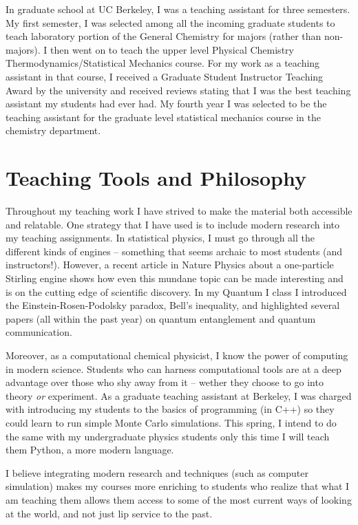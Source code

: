 \documentclass[11pt]{article}
\begin{document}
In graduate school at UC Berkeley, I was a teaching assistant for three semesters.  My first semester, I was selected among all the incoming graduate students to teach laboratory portion of the General Chemistry for majors (rather than non-majors). I then went on to teach the upper level Physical Chemistry Thermodynamics/Statistical Mechanics course.  For my work as a teaching assistant in that course, I received a Graduate Student Instructor Teaching Award by the university and received reviews stating that I was the best teaching assistant my students had ever had.  My fourth year I was selected to be the teaching assistant for the graduate level statistical mechanics course in the chemistry department.

\section{Teaching Tools and Philosophy}

Throughout my teaching work I have strived to make the material both accessible and relatable.  One strategy that I have used is to include modern research into my teaching assignments.  In statistical physics, I must go through all the different kinds of engines -- something that seems archaic to most students (and instructors!).  However, a recent article in Nature Physics about a one-particle Stirling engine shows how even this mundane topic can be made interesting and is on the cutting edge of scientific discovery.  In my Quantum I class I introduced the Einstein-Rosen-Podolsky paradox, Bell's inequality, and highlighted several papers (all within the past year) on quantum entanglement and quantum communication.

Moreover, as a computational chemical physicist, I know the power of computing in modern science.  Students who can harness computational tools are at a deep advantage over those who shy away from it  -- wether they choose to go into theory \textit{or} experiment.  As a graduate teaching assistant at Berkeley, I was charged with introducing my students to the basics of programming (in C++) so they could learn to run simple Monte Carlo simulations.  This spring, I intend to do the same with my undergraduate physics students only this time I will teach them Python, a more modern language.

I believe integrating modern research and techniques (such as computer simulation) makes my courses more enriching to students who realize that what I am teaching them allows them access to some of the most current ways of looking at the world, and not just lip service to the past.
\end{document}
